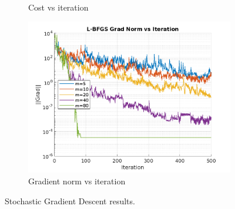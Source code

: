 \documentclass{article}
\begin{document}
\begin{figure}[H]
\begin{subfigure}[b]{0.3\textwidth}
    \caption{Cost vs iteration}
    \label{fig:lbfgs_cost}
  \end{subfigure}
  \begin{subfigure}[b]{0.3\textwidth}
    \centering
    \includegraphics[width=\textwidth]{images/lbfgs_grad_norm_vs_iteration.png}
    \caption{Gradient norm vs iteration}
    \label{fig:lbfgs_grad_norm}
  \end{subfigure}
  \caption{Stochastic Gradient Descent results.}
  \label{fig:lbfgs_results}
\end{figure}
\end{document}
